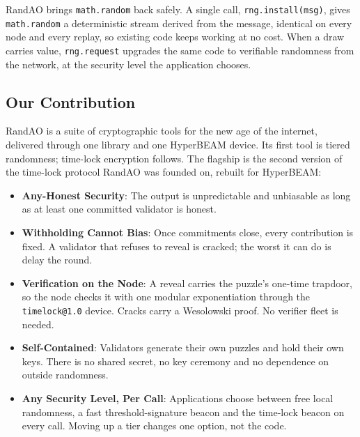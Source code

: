 RandAO brings \texttt{math.random} back safely. A single call, \texttt{rng.install(msg)}, gives \texttt{math.random} a deterministic stream derived from the message, identical on every node and every replay, so existing code keeps working at no cost. When a draw carries value, \texttt{rng.request} upgrades the same code to verifiable randomness from the network, at the security level the application chooses.

\subsection{Our Contribution}\label{sec:our_contribution}

RandAO is a suite of cryptographic tools for the new age of the internet, delivered through one library and one HyperBEAM device. Its first tool is tiered randomness; time-lock encryption follows. The flagship is the second version of the time-lock protocol RandAO was founded on, rebuilt for HyperBEAM:

\begin{itemize}
    \item \textbf{Any-Honest Security}: The output is unpredictable and unbiasable as long as at least one committed validator is honest.

    \item \textbf{Withholding Cannot Bias}: Once commitments close, every contribution is fixed. A validator that refuses to reveal is cracked; the worst it can do is delay the round.

    \item \textbf{Verification on the Node}: A reveal carries the puzzle's one-time trapdoor, so the node checks it with one modular exponentiation through the \texttt{timelock@1.0} device. Cracks carry a Wesolowski proof. No verifier fleet is needed.

    \item \textbf{Self-Contained}: Validators generate their own puzzles and hold their own keys. There is no shared secret, no key ceremony and no dependence on outside randomness.

    \item \textbf{Any Security Level, Per Call}: Applications choose between free local randomness, a fast threshold-signature beacon and the time-lock beacon on every call. Moving up a tier changes one option, not the code.
\end{itemize}
